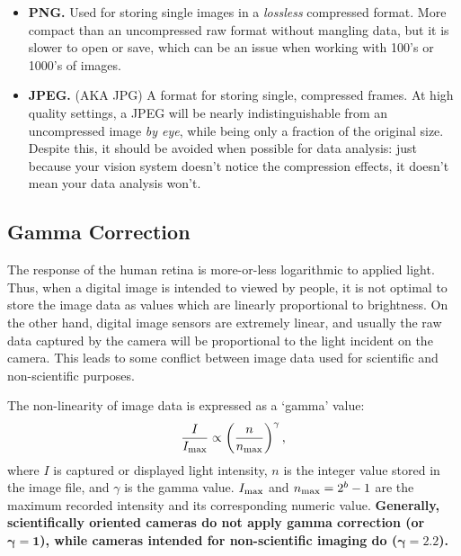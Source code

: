 \documentclass[11pt]{amsart}
\begin{document}
\begin{itemize}
\item {\bf PNG.}  Used for storing single images in a \emph{lossless} compressed format.  More compact than an uncompressed raw format without mangling data, but it is slower to open or save, which can be an issue when working with 100's or 1000's of images. 
\item {\bf JPEG.} (AKA JPG)  A format for storing single, compressed frames.  At high quality settings, a JPEG will be nearly indistinguishable from an uncompressed image \emph{by eye}, while being only a fraction of the original size.  Despite this, it should be avoided when possible for data analysis: just because your vision system doesn't notice the compression effects, it doesn't mean your data analysis won't.%
\end{itemize}

\subsection{Gamma Correction}
\label{sec:gamma}



The response of the human retina is more-or-less logarithmic to applied light.
Thus, when a digital image is intended to viewed by people, it is not optimal to store the image data as values which are linearly proportional to brightness.
On the other hand, digital image sensors are extremely linear, and usually the raw data captured by the camera will be proportional to the light incident on the camera.
This leads to some conflict between image data used for scientific and non-scientific purposes.

The non-linearity of image data is expressed as a `gamma' value:
$$
\frac{I}{I_{\rm max}} \propto \left(\frac{n}{n_{\rm max}}\right)^\gamma,
$$
where $I$ is captured or displayed light intensity, $n$ is the integer value stored in the image file, and $\gamma$ is the gamma value.
$I_{\rm max}$ and $n_{\rm max} = 2^b - 1$ are the maximum recorded intensity and its corresponding numeric value.
{\bf Generally, scientifically oriented cameras do not apply gamma correction (or $\boldsymbol{\gamma=1}$), while cameras intended for non-scientific imaging do ($\boldsymbol{\gamma=2.2}$).}
\end{document}
